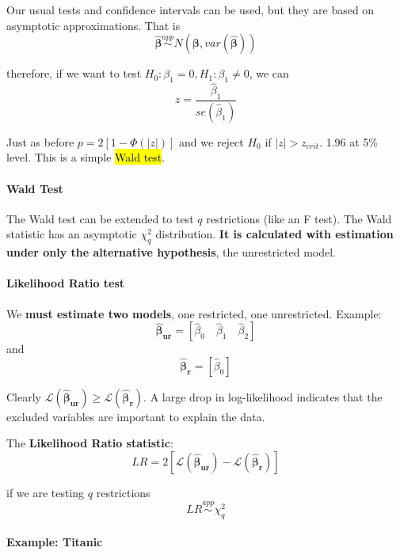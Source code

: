 \documentclass[11pt]{article}
\begin{document}
Our usual tests and confidence intervals can be used, but they are based on asymptotic approximations. That is
\[\boldsymbol{\hat{\beta}} \overset{app}{\sim} N(\boldsymbol{\beta}, var(\boldsymbol{\hat{\beta}}))\]

therefore, if we want to test $H_0: \beta_1 = 0, H_1: \beta_1 \neq 0$, we can
\[z = \dfrac{\hat{\beta}_1}{se(\hat{\beta}_1)}\]

Just as before $p = 2[1-\Phi(|z|)]$ and we reject $H_0$ if $|z|>z_{crit}$. 1.96 at 5\% level. This is a simple \hl{Wald test}.

\paragraph{Wald Test}\mbox{}

The Wald test can be extended to test $q$ restrictions (like an F test). The Wald statistic has an asymptotic $\chi_q^2$ distribution. \textbf{It is calculated with estimation under only the alternative hypothesis}, the unrestricted model.

\paragraph{Likelihood Ratio test} \mbox{}

We \textbf{must estimate two models}, one restricted, one unrestricted. Example:
\[\boldsymbol{\hat{\beta}_{ur}}= \left[\hat{\beta}_0 \quad \hat{\beta}_1 \quad \hat{\beta}_2\right]\]
and 
\[\boldsymbol{\hat{\beta}_r} = \left[\hat{\beta}_0\right]\]

Clearly $\mathcal{L}(\boldsymbol{\hat{\beta}_{ur}}) \geq \mathcal{L}(\boldsymbol{\hat{\beta}_{r}})$. A large drop in log-likelihood indicates that the excluded variables are important to explain the data.

The \textbf{Likelihood Ratio statistic}:
\[LR = 2\left[\mathcal{L}(\boldsymbol{\hat{\beta}_{ur}}) - \mathcal{L}(\boldsymbol{\hat{\beta}_{r}}) \right]\]

if we are testing $q$ restrictions
\[LR \overset{app}{\sim}\chi_q^2\]

\paragraph{Example: Titanic} \mbox{}
\end{document}
